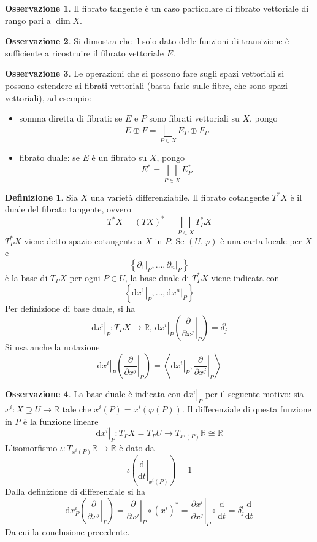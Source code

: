 \documentclass[a4paper,11pt]{article}
\theoremstyle{definition}
\newtheorem{osservazione}{Osservazione}[section]
\newtheorem{definizione}{Definizione}[section]
\theoremstyle{theorem}
\begin{document}
\begin{osservazione}
	Il fibrato tangente è un caso particolare di fibrato vettoriale di rango pari a $\dim X$.
\end{osservazione}
\begin{osservazione}
	Si dimostra che il solo dato delle funzioni di transizione è sufficiente a ricostruire il fibrato vettoriale $E$.
\end{osservazione}
\begin{osservazione}
	Le operazioni che si possono fare sugli spazi vettoriali si possono estendere ai fibrati vettoriali (basta farle sulle fibre, che sono spazi vettoriali), ad esempio:
	\begin{itemize}
		\item somma diretta di fibrati: se $E$ e $P$ sono fibrati  vettoriali su $X$, pongo
		\[E\oplus F=\bigsqcup_{P\in X}E_P\oplus F_P\]
		\item fibrato duale: se $E$ è un fibrato su $X$, pongo
		\[E^*=\bigsqcup_{P\in X}E^*_P\]
	\end{itemize}
\end{osservazione}
\begin{definizione}
	Sia $X$ una varietà differenziabile. Il fibrato cotangente $T^*X$ è il duale del fibrato tangente, ovvero \[T^*X=(TX)^*=\bigsqcup_{P\in X}T^*_PX\]
	$T^*_PX$ viene detto spazio cotangente a $X$ in $P$. Se $(U,\varphi)$ è una carta locale per $X$ e
	\[\left\{\left.\partial_1\right|_{P},\dots,\left.\partial_n\right|_{P}\right\}\]
	è la base di $T_PX$ per ogni $P\in U$, la base duale di $T^*_PX$ viene indicata con
	\[\left\{\left.\mathrm{d}x^1\right|_{P},\dots,\left.\mathrm{d}x^n\right|_{P}\right\}\]
	Per definizione di base duale, si ha
	\[\left.\mathrm{d}x^i\right|_{P}\colon T_PX\to\mathbb{R}\textrm{, }\left.\mathrm{d}x^i\right|_{P}\left(\left.\frac{\partial}{\partial x^j}\right|_{P}\right)=\delta^i_j\]
	Si usa anche la notazione
	\[\left.\mathrm{d}x^i\right|_{P}\left(\left.\frac{\partial}{\partial x^j}\right|_{P}\right)=\left\langle \left.\mathrm{d}x^i\right|_{P},\left.\frac{\partial}{\partial x^j}\right|_{P}\right\rangle\]
\end{definizione}
\begin{osservazione}
	La base duale è indicata con $\left.\mathrm{d}x^i\right|_{P}$ per il seguente motivo: sia $x^i\colon X\supseteq U\to\mathbb{R}$ tale che $x^i(P)=x^i(\varphi(P))$. Il differenziale di questa funzione in $P$ è la funzione lineare
	\[\left.\mathrm{d}x^i\right|_P\colon T_PX=T_PU\to T_{x^i(P)}\mathbb{R}\cong\mathbb{R}\]
	L'isomorfismo $\iota\colon T_{x^i(P)}\mathbb{R}\to\mathbb{R}$ è dato da
	\[\iota\left(\left.\frac{\mathrm{d}}{\mathrm{d}t}\right|_{x^i(P)}\right)=1\]
	Dalla definizione di differenziale si ha
	\[\mathrm{d}x^i_P\left(\left.\frac{\partial}{\partial x^j}\right|_{P}\right)=\left.\frac{\partial}{\partial x^j}\right|_{P}\circ\left(x^i\right)^*=\left.\frac{\partial x^i}{\partial x^j}\right|_{P}\circ\frac{\mathrm{d}}{\mathrm{d}t}=\delta^i_j\frac{\mathrm{d}}{\mathrm{d}t}\]
	Da cui la conclusione precedente.
\end{osservazione}
\end{document}
